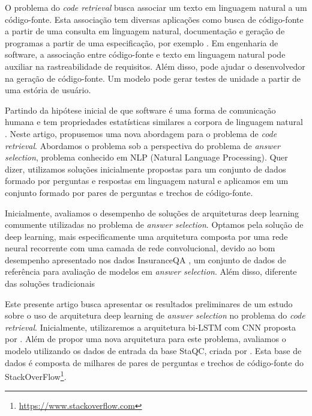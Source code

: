 \documentclass[12pt]{article}
\begin{document}
O problema do \textit{code retrieval} busca associar um texto em linguagem natural a um código-fonte. Esta associação tem diversas aplicações como busca de código-fonte a partir de uma consulta em linguagem natural, documentação e geração de programas a partir de uma especificação, por exemplo \cite{Allamanis:2018:SML}. Em engenharia de software, a associação entre código-fonte e texto em linguagem natural pode auxiliar na rastreabilidade de requisitos. Além disso, pode ajudar o desenvolvedor na geração de código-fonte. Um modelo pode gerar testes de unidade a partir de uma estória de usuário.

Partindo da hipótese inicial de que software é uma forma de comunicação humana e tem propriedades estatísticas similares a corpora de linguagem natural \cite{Allamanis:2018:SML}. Neste artigo, propusemos uma nova abordagem para o problema de \textit{code retrieval}. Abordamos o problema sob a perspectiva do problema de \textit{answer selection}, problema conhecido em NLP (Natural Language Processing). Quer dizer, utilizamos soluções inicialmente propostas para um conjunto de dados formado por perguntas e respostas em linguagem natural e aplicamos em um conjunto formado por pares de perguntas e trechos de código-fonte.

Inicialmente, avaliamos o desempenho de soluções de arquiteturas deep learning comumente utilizadas no problema de \textit{answer selection}. Optamos pela solução de deep learning, mais especificamente uma arquitetura composta por uma rede neural recorrente com uma camada de rede convolucional, devido ao bom desempenho apresentado nos dados InsuranceQA \cite{feng-answer-selection-2015}, um conjunto de dados de referência para avaliação de modelos em \textit{answer selection}. Além disso, diferente das soluções tradicionais 

Este presente artigo busca apresentar os resultados preliminares de um estudo sobre o uso de arquitetura deep learning de \textit{answer selection} no problema do \textit{code retrieval}. Inicialmente, utilizaremos a arquitetura bi-LSTM com CNN proposta por \cite{tan-lstm-qa}. Além de propor uma nova arquitetura para este problema, avaliamos o modelo utilizando os dados de entrada da base StaQC, criada por \cite{Yao-staqc:2018}. Esta base de dados é composta de milhares de pares de perguntas e trechos de código-fonte do StackOverFlow\footnote{\url{https://www.stackoverflow.com}}.  
\end{document}
